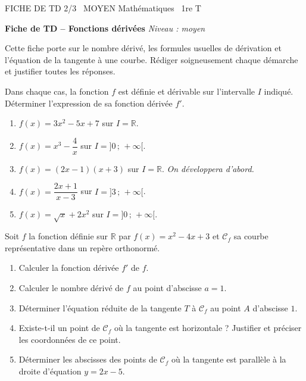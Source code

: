 \documentclass[11pt]{article}
\begin{document}
\begin{tcolorbox}[enhanced,colback=popink,colframe=popink,arc=10pt,boxrule=0pt,left=12pt,right=12pt,top=9pt,bottom=9pt]
{\color{white}\popxbold\small FICHE DE TD 2/3 \textbullet\ MOYEN \hfill Mathématiques \textbullet\ 1re T\par}
\end{tcolorbox}
\vspace{4pt}
\textbf{Fiche de TD -- Fonctions dérivées} \hfill \textit{Niveau : moyen}

Cette fiche porte sur le nombre dérivé, les formules usuelles de dérivation et l'équation de la tangente à une courbe. Rédiger soigneusement chaque démarche et justifier toutes les réponses.

\begin{exercice}
Dans chaque cas, la fonction $f$ est définie et dérivable sur l'intervalle $I$ indiqué. Déterminer l'expression de sa fonction dérivée $f'$.
\begin{enumerate}
\item $f(x)=3x^{2}-5x+7$ sur $I=\mathbb{R}$.
\item $f(x)=x^{3}-\dfrac{4}{x}$ sur $I=]0\,;\,+\infty[$.
\item $f(x)=(2x-1)(x+3)$ sur $I=\mathbb{R}$. \textit{On développera d'abord.}
\item $f(x)=\dfrac{2x+1}{x-3}$ sur $I=]3\,;\,+\infty[$.
\item $f(x)=\sqrt{x}+2x^{2}$ sur $I=]0\,;\,+\infty[$.
\end{enumerate}
\end{exercice}

\begin{exercice}
Soit $f$ la fonction définie sur $\mathbb{R}$ par $f(x)=x^{2}-4x+3$ et $\mathcal{C}_{f}$ sa courbe représentative dans un repère orthonormé.
\begin{enumerate}
\item Calculer la fonction dérivée $f'$ de $f$.
\item Calculer le nombre dérivé de $f$ au point d'abscisse $a=1$.
\item Déterminer l'équation réduite de la tangente $T$ à $\mathcal{C}_{f}$ au point $A$ d'abscisse $1$.
\item Existe-t-il un point de $\mathcal{C}_{f}$ où la tangente est horizontale ? Justifier et préciser les coordonnées de ce point.
\item Déterminer les abscisses des points de $\mathcal{C}_{f}$ où la tangente est parallèle à la droite d'équation $y=2x-5$.
\end{enumerate}
\end{exercice}
\end{document}
